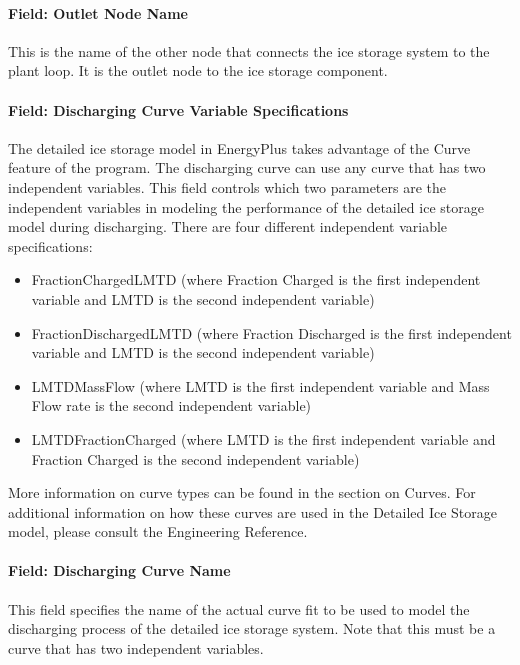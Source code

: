 \paragraph{Field: Outlet Node Name}\label{field-outlet-node-name-1-002}

This is the name of the other node that connects the ice storage system to the plant loop. It is the outlet node to the ice storage component.

\paragraph{Field: Discharging Curve Variable Specifications}\label{field-discharging-curve-variable-specifications}

The detailed ice storage model in EnergyPlus takes advantage of the Curve feature of the program.  The discharging curve can use any curve that has two independent variables.  This field controls which two parameters are the independent variables in modeling the performance of the detailed ice storage model during discharging. There are four different independent variable specifications:

\begin{itemize}
\item
FractionChargedLMTD (where Fraction Charged is the first independent variable and LMTD is the second independent variable)
\item 
FractionDischargedLMTD (where Fraction Discharged is the first independent variable and LMTD is the second independent variable)
\item
LMTDMassFlow (where LMTD is the first independent variable and Mass Flow rate is the second independent variable)
\item
LMTDFractionCharged (where LMTD is the first independent variable and Fraction Charged is the second independent variable)
\end{itemize}

More information on curve types can be found in the section on Curves.  For additional information on how these curves are used in the Detailed Ice Storage model, please consult the Engineering Reference.

\paragraph{Field: Discharging Curve Name}\label{field-discharging-curve-name}

This field specifies the name of the actual curve fit to be used to model the discharging process of the detailed ice storage system. Note that this must be a curve that has two independent variables.

